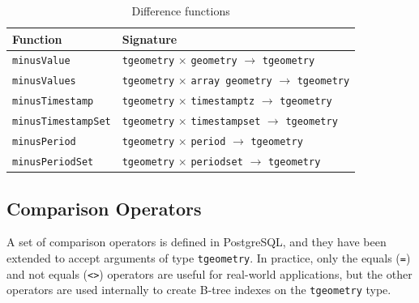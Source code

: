 \begin{table}[h!]
    \centering
    \begin{tabularx}{\textwidth}{|l|X|}
    \hline
    \textbf{Function}   & \textbf{Signature} \\ 
    \hline
    \lstinline+minusValue+             & \lstinline+tgeometry+ $\times$ \lstinline+geometry+ $\rightarrow$ \lstinline+tgeometry+\\
    \hline
    \lstinline+minusValues+            & \lstinline+tgeometry+ $\times$ \lstinline+array geometry+ $\rightarrow$ \lstinline+tgeometry+\\
    \hline
    \lstinline+minusTimestamp+         & \lstinline+tgeometry+ $\times$ \lstinline+timestamptz+ $\rightarrow$ \lstinline+tgeometry+ \\
    \hline
    \lstinline+minusTimestampSet+      & \lstinline+tgeometry+ $\times$ \lstinline+timestampset+ $\rightarrow$ \lstinline+tgeometry+ \\
    \hline
    \lstinline+minusPeriod+            & \lstinline+tgeometry+ $\times$ \lstinline+period+ $\rightarrow$ \lstinline+tgeometry+ \\
    \hline
    \lstinline+minusPeriodSet+         & \lstinline+tgeometry+ $\times$ \lstinline+periodset+ $\rightarrow$ \lstinline+tgeometry+ \\
    \hline
    \end{tabularx}
    \caption{Difference functions}
    \label{table:diff_funcs}
\end{table}

\subsection{Comparison Operators}
\label{section:comparison_funcs}

A set of comparison operators is defined in PostgreSQL, and they have been extended to accept arguments of type \lstinline+tgeometry+. In practice, only the equals (\lstinline+=+) and not equals (\lstinline+<>+) operators are useful for real-world applications, but the other operators are used internally to create B-tree indexes on the \lstinline+tgeometry+ type.


